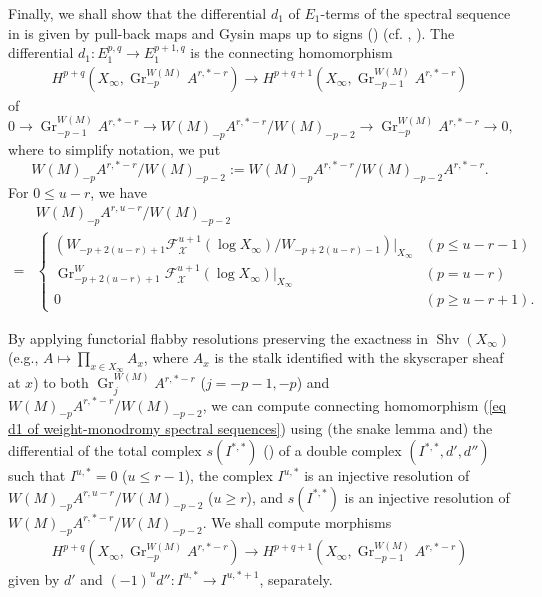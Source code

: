\documentclass[12pt,a4]{amsart}
\def\F{\mathscr{F}}
\def\X{\mathscr{X}}
\def\Shv{\mathop{\mathrm{Shv}}\nolimits}
\def\Gr{\mathop{\mathrm{Gr}}\nolimits}
\def\Gr{\mathop{\mathrm{Gr}}\nolimits}
\numberwithin{equation}{section}
\numberwithin{figure}{section}
\begin{document}
  Finally, 
   we shall show that 
   the differential $d_1$
   of $E_1$-terms of the spectral sequence 
   in 
    is
    given by pull-back maps 
    and 
    Gysin maps up to signs ()
    (cf. \cite[Lemme 2.7]{GuillenNavarroSurlethormelocaldescyclesinvariantsAznar1990}, 
     \cite[Subsection 11.3.2]{PetersSteenbrinkMixedHodgestructures2008}).
   The differential $d_1 \colon E_1^{p,q} \to E_1^{p+1,q}$  
   is the  connecting homomorphism 
   \begin{align}\label{eq d1 of weight-monodromy spectral sequences}
     H^{p+q} (X_{\infty}, \Gr^{W(M)}_{-p} A^{r,*-r}  ) 
     \to 
     H^{p+q+1} (X_{\infty}, \Gr^{W(M)}_{-p-1} A^{r,*-r}  ) 
   \end{align}
   of 
   $$ 0 \to 
     \Gr^{W(M)}_{-p-1} A^{r,*-r} 
     \to 
      W(M)_{-p} A^{r,*-r} / W(M)_{-p-2} 
     \to 
      \Gr^{W(M)}_{-p} A^{r,*-r} 
      \to 0, $$
    where to simplify notation, we put 
    $$ 
      W(M)_{-p} A^{r,*-r} / W(M)_{-p-2} 
      :=
      W(M)_{-p} A^{r,*-r} / W(M)_{-p-2} A^{r,*-r} .$$
    For $0 \leq u-r$,
      we have 
    \begin{align*}
      & W (M)_{-p} A^{r,u-r} / W(M)_{-p-2}   \\
      = &
          \begin{cases}
       ( W_{-p+2(u-r)+1}  \F_{\X}^{u+1} (\log X_{\infty}) 
       / W_{-p+2(u-r)-1}  )
        |_{X_{\infty}} 
        &
        (  p \leq u-r -1)
        \\ 
       \Gr^W_{-p+2(u-r)+1}  \F_{\X}^{u+1} (\log X_{\infty}) 
        |_{X_{\infty}} 
        &
        (  p = u-r  ) \\ 
        0 & ( p  \geq u-r +1 ).
        \end{cases}
    \end{align*}

  
  By applying functorial flabby resolutions preserving the exactness in $\Shv (X_{\infty})$
    (e.g., $A \mapsto \prod_{x \in X_{\infty}} A_x $, 
     where $A_x$ is the stalk identified with 
        the skyscraper sheaf at $x$)
        to both 
   $\Gr^{W(M)}_{j} A^{r,*-r} $ ($j=-p-1,-p$) 
    and 
   $    W(M)_{-p} A^{r,*-r} / W(M)_{-p-2} $, 
   we can compute connecting homomorphism (\ref{eq d1 of weight-monodromy spectral sequences})
   using (the snake lemma and) 
   the differential of the total complex $s(I^{*,*})$ () of 
   a double complex $(I^{*,*},d', d'')$ 
   such that 
   $I^{u,*}=0$ ($u \leq r-1$), 
   the complex $I^{u,*}$ is an injective resolution of 
   $    W(M)_{-p} A^{r,u-r} / W(M)_{-p-2} $ ($u \geq r$), 
   and 
   $s(I^{*,*})$ is an injective resolution of 
    $   W(M)_{-p} A^{r,*-r} / W(M)_{-p-2} $.
  We shall compute morphisms 
  \begin{align}\label{eq d1 separetely}
     H^{p+q} (X_{\infty}, \Gr^{W(M)}_{-p} A^{r,*-r}  ) 
     \to 
     H^{p+q+1} (X_{\infty}, \Gr^{W(M)}_{-p-1} A^{r,*-r}  ) 
  \end{align}
    given by $d'$ and $(-1)^u d'' \colon I^{u,*} \to I^{u,*+1}$, separately. 
\end{document}
